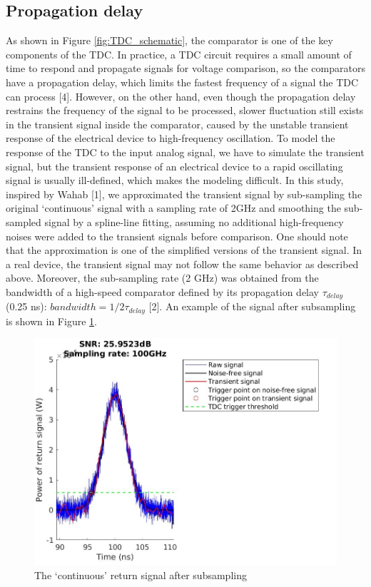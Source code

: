\subsection{Propagation delay}
As shown in Figure \ref{fig:TDC_schematic}, the comparator is one of the key components of the TDC. In practice, a TDC circuit requires a small amount of time to respond and propagate signals for voltage comparison, so the comparators have a propagation delay, which limits the fastest frequency of a signal the TDC can process [4]. However, on the other hand, even though the propagation delay restrains the frequency of the signal to be processed, slower fluctuation still exists in the transient signal inside the comparator, caused by the unstable transient response of the electrical device to high-frequency oscillation. To model the response of the TDC to the input analog signal, we have to simulate the transient signal, but the transient response of an electrical device to a rapid oscillating signal is usually ill-defined, which makes the modeling difficult. In this study, inspired by Wahab [1], we approximated the transient signal by sub-sampling the original ‘continuous' signal with a sampling rate of 2GHz and smoothing the sub-sampled signal by a spline-line fitting, assuming no additional high-frequency noises were added to the transient signals before comparison. One should note that the approximation is one of the simplified versions of the transient signal. In a real device, the transient signal may not follow the same behavior as described above. Moreover, the sub-sampling rate (2 GHz) was obtained from the bandwidth of a high-speed comparator defined by its propagation delay $\tau_{delay}$ (0.25 ns): $bandwidth = 1/2\tau_{delay}$ [2]. An example of the signal after subsampling is shown in Figure \ref{fig:TDC_subsampling}.
\begin{figure}[t!p]
\centering
\includegraphics[width=.8\textwidth]{figures/chapter7_TDC/fig_subsampling.jpg}
\caption{The ‘continuous’ return signal after subsampling}
\label{fig:TDC_subsampling}
\end{figure}
